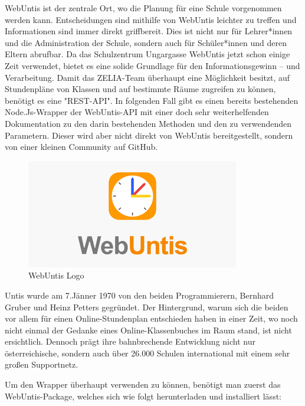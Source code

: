 

WebUntis ist der zentrale Ort, wo die Planung für eine Schule vorgenommen werden kann. Entscheidungen sind mithilfe von WebUntis leichter zu treffen und Informationen sind immer direkt griffbereit. Dies ist nicht nur für Lehrer*innen und die Administration der Schule, sondern auch für Schüler*innen und deren Eltern abrufbar. Da das Schulzentrum Ungargasse WebUntis jetzt schon einige Zeit verwendet, bietet es eine solide Grundlage für den Informationsgewinn – und Verarbeitung. Damit das ZELIA-Team überhaupt eine Möglichkeit besitzt, auf Stundenpläne von Klassen und auf bestimmte Räume zugreifen zu können, benötigt es eine "REST-API". In folgenden Fall gibt es einen bereits bestehenden Node.Js-Wrapper der WebUntis-API mit einer doch sehr weiterhelfenden Dokumentation zu den darin bestehenden Methoden und den zu verwendenden Parametern. Dieser wird aber nicht direkt von WebUntis bereitgestellt, sondern von einer kleinen Community auf GitHub. \cite{WebUntisWrapper}

\begin{figure}[H]
    \centering
    \includegraphics{media/WebUntis/WebUntisLogo.png}
    \caption{WebUntis Logo\cite{WebUntisLogo}}
\end{figure}


Untis wurde am 7.Jänner 1970 von den beiden Programmierern, Bernhard Gruber und Heinz Petters gegründet. Der Hintergrund, warum sich die beiden vor allem für einen Online-Stundenplan entschieden haben in einer Zeit, wo noch nicht einmal der Gedanke eines Online-Klassenbuches im Raum stand, ist nicht ersichtlich. Dennoch prägt ihre bahnbrechende Entwicklung nicht nur österreichische, sondern auch über 26.000 Schulen international mit einem sehr großen Supportnetz. \cite{Untis}


Um den Wrapper überhaupt verwenden zu können, benötigt man zuerst das WebUntis-Package, welches sich wie folgt herunterladen und installiert lässt:



